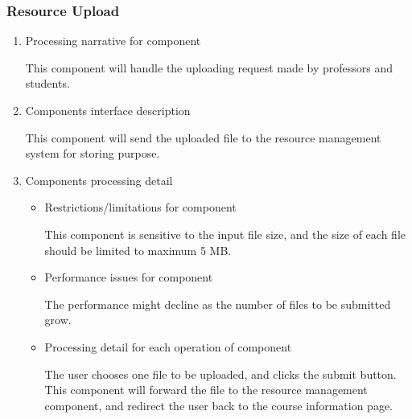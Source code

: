 \documentclass[paper=a4, fontsize=11pt]{scrartcl}
\numberwithin{equation}{section}		%
\numberwithin{figure}{section}			%
\numberwithin{table}{section}				%
\begin{document}
\subsubsection{Resource Upload}
\begin{enumerate}
	\item Processing narrative for component
	\par This component will handle the uploading request made by professors and students.
	\item Components interface description
	\par This component will send the uploaded file to the resource management system for storing purpose.
	\item Components processing detail
	\begin{itemize}
		\item Restrictions/limitations for component
		\par This component is sensitive to the input file size, and the size of each file should be limited to maximum 5 MB.
		\item Performance issues for component 
		\par The performance might decline as the number of files to be submitted grow.
		\item Processing detail for each operation of component 
		\par The user chooses one file to be uploaded, and clicks the submit button. This component will forward the file to the resource management component, and redirect the user back to the course information page.
	\end{itemize}
\end{enumerate}
\end{document}
